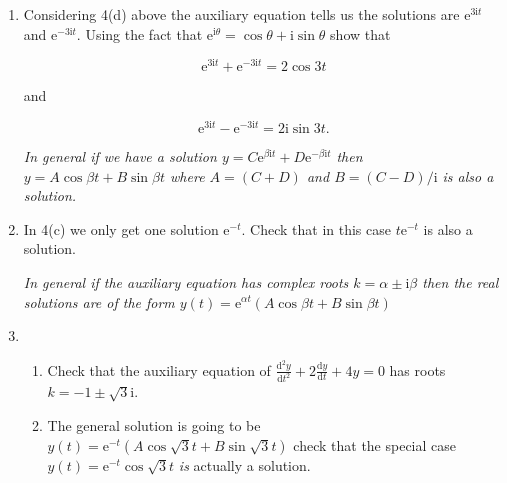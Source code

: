 \documentclass[11pt,a4paper]{article}
\newcommand{\diff}{\mathrm{d}}
\begin{document}
\begin{enumerate}
\item Considering 4(d) above the auxiliary equation tells us the solutions are $\mathrm{e}^{3\mathrm{i}t}$ and $\mathrm{e}^{-3\mathrm{i}t}$.  Using the fact that  $\mathrm{e}^{\mathrm{i}\theta}= \cos \theta + \mathrm{i} \sin\theta$ show that 

$$\mathrm{e}^{3\mathrm{i}t} + \mathrm{e}^{-3\mathrm{i}t} = 2 \cos 3t$$

 and

$$\mathrm{e}^{3\mathrm{i}t} - \mathrm{e}^{-3\mathrm{i}t} = 2\mathrm{i} \sin 3t.$$

{\em In general if we have a solution $ y= C \mathrm{e}^{\beta\mathrm{i}t}  +D \mathrm{e}^{-\beta\mathrm{i}t}$ then $y = A \cos \beta t + B \sin \beta t$ where $A= (C+D)$ and $B = (C-D)/\mathrm{i}$  is also a solution.}

\item In 4(c) we only get one solution $\mathrm{e}^{-t}$. Check that in this case $t\mathrm{e}^{-t}$ is also a solution.

{\em In general if the auxiliary equation has complex roots $k=\alpha \pm \mathrm{i}\beta$ then the real solutions are of the form $y(t)= \mathrm{e}^{\alpha t}\left( A\cos \beta t + B \sin \beta t\right)$ }

\item 
\begin{enumerate}
\item Check that the auxiliary equation of
$\frac{\diff^2 y}{\diff t^2}+ 2 \frac{\diff y}{\diff t} +4 y = 0 $
has roots $k=-1 \pm \sqrt{3}\mathrm{i}$.
\item The general solution is going to be $y(t)= \mathrm{e}^{- t}\left( A\cos \sqrt{3} t + B \sin \sqrt{3} t\right)$ check that the special case $y(t)= \mathrm{e}^{- t}\cos \sqrt{3} t $ {\em is} actually a solution.
\end{enumerate}








\end{enumerate}
\vfill\eject
\end{document}
